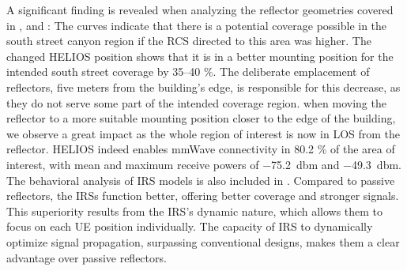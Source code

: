 A significant finding is revealed when analyzing the reflector geometries covered in , and : The curves indicate that there is a potential coverage possible in the south street canyon region if the RCS directed to this area was higher. The changed HELIOS position shows that it is in a better mounting position for the intended south street coverage by \num{35}–\num{40} $\%$. The deliberate emplacement of reflectors, five meters from the building's edge, is responsible for this decrease, as they do not serve some part of the intended coverage region. when moving the reflector to a more suitable mounting position closer to the edge of the building, we observe a great impact as the whole region of interest is now in LOS from the reflector. HELIOS indeed enables mmWave connectivity in \num{80.2} \% of the area of interest, with mean and maximum receive powers of \SI{-75.2}{\decibel}m and \SI{-49.3}{\decibel}m. The behavioral analysis of IRS models is also included in . Compared to passive reflectors, the IRSs function better, offering better coverage and stronger signals. This superiority results from the IRS's dynamic nature, which allows them to focus on each UE position individually. The capacity of IRS to dynamically optimize signal propagation, surpassing conventional designs, makes them a clear advantage over passive reflectors.
